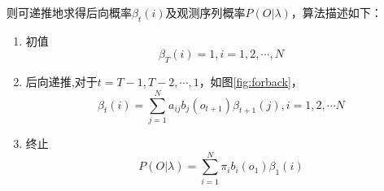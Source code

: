         则可递推地求得后向概率${\beta _t}(i)$及观测序列概率$P(O|\lambda )$，算法描述如下：
        \begin{enumerate}
            \item 初值
                \begin{equation}
                    {\beta _T}(i) = 1,i = 1,2, \cdots ,N
                \end{equation}
            \item 后向递推,对于$t = T - 1,T - 2, \cdots ,1$，如图\ref{fig:forback}，
                 \begin{equation}
                    {\beta _t}(i) = \sum\limits_{j = 1}^N {{a_{ij}}{b_j}({o_{t + 1}}){\beta _{t + 1}}(j),i = 1,2, \cdots N}
                 \end{equation}
            \item 终止
                \begin{equation}
                    P(O|\lambda ) = \sum\limits_{i = 1}^N {{\pi _i}{b_i}({o_1}){\beta _1}\left( i \right)}
                \end{equation}
        \end{enumerate}

